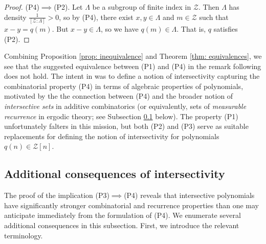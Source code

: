 \documentclass[11pt]{amsart}
\theoremstyle{theorem}
\theoremstyle{definition}
\newcommand{\mZ}{\mathcal{Z}}
\begin{document}
\begin{proof}
	(P4)$\implies$(P2).
	Let $\Lambda$ be a subgroup of finite index in $\mZ$.
	Then $\Lambda$ has density $\frac{1}{[\mZ : \Lambda]} > 0$, so by (P4), there exist $x,y \in \Lambda$ and $m \in \mZ$ such that $x - y = q(m)$.
	But $x - y \in \Lambda$, so we have $q(m) \in \Lambda$.
	That is, $q$ satisfies (P2).
\end{proof}

Combining Proposition \ref{prop: inequivalence} and Theorem \ref{thm: equivalences}, we see that the suggested equivalence between (P1) and (P4) in the remark following \cite[Theorem 9.5]{bl} does not hold.
The intent in \cite{bl} was to define a notion of intersectivity capturing the combinatorial property (P4) in terms of algebraic properties of polynomials, motivated by the the connection between (P4)  and the broader notion of \emph{intersective sets} in additive combinatorics \cite{ruzsa} (or equivalently, sets of \emph{measurable recurrence} in ergodic theory; see Subsection \ref{sec: additional consequences} below).
The property (P1) unfortunately falters in this mission, but both (P2) and (P3) serve as suitable replacements for defining the notion of intersectivity for polynomials $q(n) \in \mZ[n]$.

\subsection{Additional consequences of intersectivity} \label{sec: additional consequences}

The proof of the implication (P3)$\implies$(P4) reveals that intersective polynomials have significantly stronger combinatorial and recurrence properties than one may anticipate immediately from the formulation of (P4).
We enumerate several additional consequences in this subsection.
First, we introduce the relevant terminology.
\end{document}
